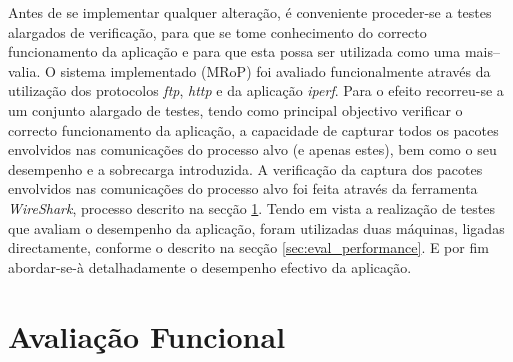 








Antes de se implementar qualquer alteração, é conveniente proceder-se a testes alargados de verificação, para que se tome conhecimento do correcto funcionamento da aplicação e para que esta possa ser utilizada como uma mais–valia. 
O sistema implementado (MRoP) foi avaliado funcionalmente através da utilização dos protocolos \textit{ftp}, \textit{http} e da aplicação \textit{iperf}\cite{iperf}.
Para o efeito recorreu-se a um conjunto alargado de testes, tendo como principal objectivo verificar o correcto funcionamento da aplicação, a capacidade de capturar todos os pacotes envolvidos nas comunicações do processo alvo (e apenas estes), bem como o seu desempenho e a sobrecarga introduzida.
A verificação da captura dos pacotes envolvidos nas comunicações do processo alvo foi feita através da ferramenta \textit{WireShark}, processo descrito na secção \ref{sec:eval_functional}.
Tendo em vista a realização de testes que avaliam o desempenho da aplicação, foram utilizadas duas máquinas, ligadas directamente, conforme o descrito  na secção \ref{sec:eval_performance}.
E por fim abordar-se-à detalhadamente o desempenho efectivo da aplicação.


\section{Avaliação Funcional}
\label{sec:eval_functional}


